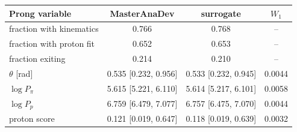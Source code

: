 \begin{tabular}{lccc}
\toprule
Prong variable & MasterAnaDev & surrogate & $W_1$ \\
\midrule
fraction with kinematics & 0.766 & 0.768 & -- \\
fraction with proton fit & 0.652 & 0.653 & -- \\
fraction exiting & 0.214 & 0.210 & -- \\
$\theta$ [rad] & 0.535 [0.232, 0.956] & 0.533 [0.232, 0.945] & 0.0044 \\
$\log P_\pi$ & 5.615 [5.221, 6.110] & 5.614 [5.217, 6.101] & 0.0058 \\
$\log P_p$ & 6.759 [6.479, 7.077] & 6.757 [6.475, 7.070] & 0.0044 \\
proton score & 0.121 [0.019, 0.647] & 0.118 [0.019, 0.639] & 0.0032 \\
\bottomrule
\end{tabular}
